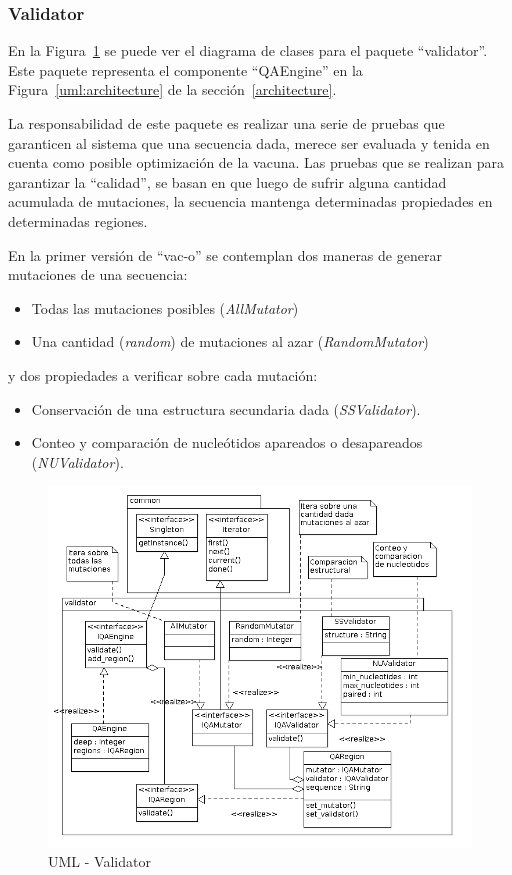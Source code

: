   \subsubsection{Validator}
  En la Figura~\ref{uml:lld-validator} se puede ver el diagrama de clases
para el paquete ``validator''. Este paquete representa el componente
``QAEngine'' en la Figura~\ref{uml:architecture} de la
secci\'on~\ref{architecture}.

  La responsabilidad de este paquete es realizar una serie de pruebas que
garanticen al sistema que una secuencia dada, merece ser evaluada y tenida en
cuenta como posible optimizaci\'on de la vacuna. Las pruebas que se realizan
para garantizar la ``calidad'', se basan en que luego de sufrir alguna cantidad
acumulada de mutaciones, la secuencia mantenga determinadas propiedades en
determinadas regiones.

  En la primer versi\'on de ``vac-o'' se contemplan dos maneras de generar
mutaciones de una secuencia:
    \begin{itemize}
     \item Todas las mutaciones posibles (\textit{AllMutator})
     \item Una cantidad (\textit{random}) de mutaciones al azar
(\textit{RandomMutator})
    \end{itemize}
y dos propiedades a verificar sobre cada mutaci\'on:
    \begin{itemize}
     \item Conservaci\'on de una estructura secundaria dada
(\textit{SSValidator}).
     \item Conteo y comparaci\'on de nucle\'otidos apareados o desapareados
(\textit{NUValidator}).
    \end{itemize}

    \begin{figure}
      \centering
      \includegraphics[scale=0.5]{lld-validator.png}  
      \caption{UML - Validator}
      \label{uml:lld-validator}
    \end{figure}

